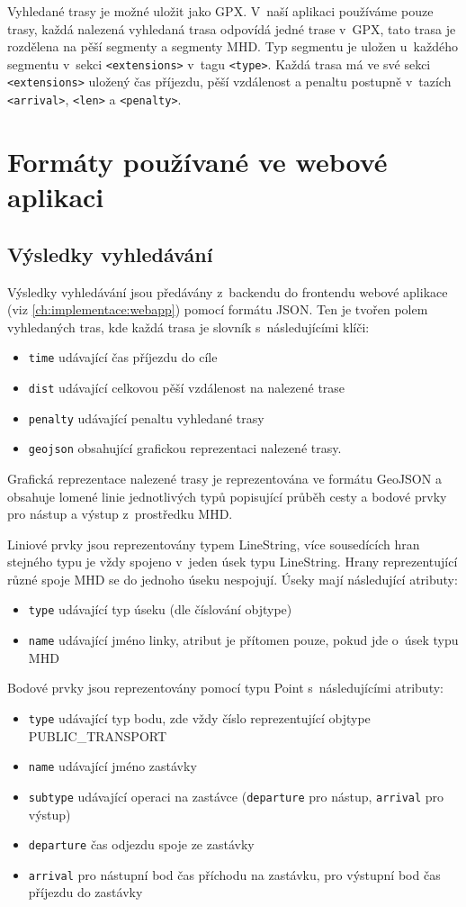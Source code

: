 Vyhledané trasy je možné uložit jako GPX\cite{GPX}. V~naší aplikaci používáme pouze trasy, každá
nalezená vyhledaná trasa odpovídá jedné trase v~GPX, tato trasa je rozdělena na
pěší segmenty a segmenty MHD. Typ segmentu je uložen u~každého segmentu v~sekci
{\tt <extensions>} v~tagu {\tt <type>}. Každá trasa má ve své sekci {\tt
<extensions>} uložený čas příjezdu, pěší vzdálenost a penaltu postupně v~tazích
{\tt <arrival>}, {\tt <len>} a {\tt <penalty>}.

\section{Formáty používané ve webové aplikaci}
\subsection{Výsledky vyhledávání}
Výsledky vyhledávání jsou předávány z~backendu do frontendu webové aplikace
(viz \ref{ch:implementace:webapp}) pomocí formátu JSON\cite{JSON}. Ten je tvořen polem vyhledaných
tras, kde každá trasa je slovník s~následujícími klíči:
\begin{itemize}
	\item {\tt time} udávající čas příjezdu do cíle
	\item {\tt dist} udávající celkovou pěší vzdálenost na nalezené trase
	\item {\tt penalty} udávající penaltu vyhledané trasy
	\item {\tt geojson} obsahující grafickou reprezentaci nalezené trasy. 
\end{itemize}
Grafická reprezentace nalezené trasy je reprezentována ve formátu
GeoJSON\cite{GeoJSON} a
obsahuje lomené linie jednotlivých typů popisující průběh cesty a bodové prvky
pro nástup a výstup z~prostředku MHD.

Liniové prvky jsou reprezentovány typem LineString, více sousedících hran
stejného typu je vždy spojeno v~jeden úsek typu LineString. Hrany reprezentující různé
spoje MHD se do jednoho úseku nespojují. Úseky mají následující atributy: 
\begin{itemize}
	\item {\tt type} udávající typ úseku (dle číslování objtype)
	\item {\tt name} udávající jméno linky, atribut je přítomen pouze, pokud
	jde o~úsek typu MHD
\end{itemize}
Bodové prvky jsou reprezentovány pomocí typu Point s~následujícími atributy: 
\begin{itemize}
	\item {\tt type} udávající typ bodu, zde vždy číslo reprezentující objtype PUBLIC\_TRANSPORT  	
	\item {\tt name} udávající jméno zastávky
	\item {\tt subtype} udávající operaci na zastávce ({\tt departure} pro
	nástup, {\tt arrival} pro výstup)
	\item {\tt departure} čas odjezdu spoje ze zastávky
	\item {\tt arrival} pro nástupní bod čas příchodu na zastávku, pro
	výstupní bod čas příjezdu do zastávky
\end{itemize}
